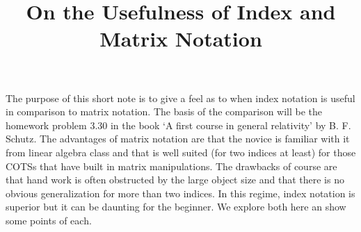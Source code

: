 \documentclass[12pt]{article}
\begin{document}
\title{On the Usefulness of Index and Matrix Notation}
\maketitle


The purpose of this short note is to give a feel as to when index notation
is useful in comparison to matrix notation.  The basis of the comparison
will be the homework problem 3.30 in the book `A first course in general
relativity' by B. F. Schutz.  The advantages of matrix notation are that
the novice is familiar with it from linear algebra class and that is well
suited (for two indices at least) for those COTSs that have built in matrix
manipulations.  The drawbacks of course are that hand work is often obstructed
by the large object size and that there is no obvious generalization
for more than two indices.  In this regime, index notation is superior but it
can be daunting for the beginner.  We explore both here an show some points of
each.
\end{document}
